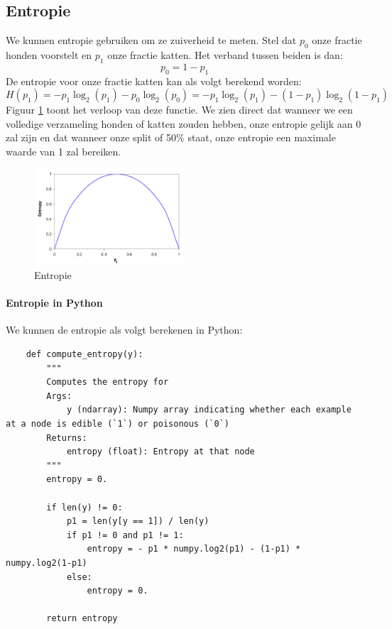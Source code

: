 \subsection{Entropie}

We kunnen entropie gebruiken om ze zuiverheid te meten. Stel dat $p_{0}$ onze fractie honden voorstelt en $p_{1}$ onze fractie katten. Het verband tussen beiden is dan:
\begin{equation}
	p_{0} = 1 - p_{1}
\end{equation}
\noindent
De entropie voor onze fractie katten kan als volgt berekend worden:
\begin{equation}
	H(p_{1}) = - p_{1} \log_{2} (p_{1}) - p_{0} \log_{2} (p_{0})
	= - p_{1} \log_{2} (p_{1}) - ( 1 - p_{1}) \log_{2} ( 1 - p_{1})
	\label{eq:entropy}
\end{equation}
\noindent
Figuur \ref{fig:entropy} toont het verloop van deze functie. We zien direct dat wanneer we een volledige verzameling honden of katten zouden hebben, onze entropie gelijk aan 0 zal zijn en dat wanneer onze split of 50$\%$ staat, onze entropie een maximale waarde van 1 zal bereiken.

\begin{figure}[h]
	\centering
	\includegraphics[width=0.5\textwidth]{images/30-entropy.png}
	\caption{Entropie}
	\label{fig:entropy}
\end{figure}

\paragraph{Entropie in Python}

We kunnen de entropie als volgt berekenen in Python:

\begin{lstlisting}
	def compute_entropy(y):
	    """
	    Computes the entropy for
	    Args:
	        y (ndarray): Numpy array indicating whether each example at a node is edible (`1`) or poisonous (`0`)
	    Returns:
	        entropy (float): Entropy at that node
	    """
	    entropy = 0.
	
	    if len(y) != 0:
	        p1 = len(y[y == 1]) / len(y)
	        if p1 != 0 and p1 != 1:
	            entropy = - p1 * numpy.log2(p1) - (1-p1) * numpy.log2(1-p1)
	        else:
	            entropy = 0.
	
	    return entropy
\end{lstlisting}
\newpage
